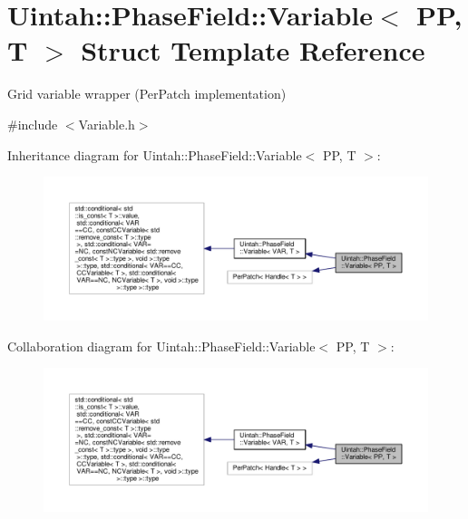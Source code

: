\hypertarget{structUintah_1_1PhaseField_1_1Variable_3_01PP_00_01T_01_4}{}\section{Uintah\+:\+:Phase\+Field\+:\+:Variable$<$ PP, T $>$ Struct Template Reference}
\label{structUintah_1_1PhaseField_1_1Variable_3_01PP_00_01T_01_4}


Grid variable wrapper (Per\+Patch implementation)  




{\ttfamily \#include $<$Variable.\+h$>$}



Inheritance diagram for Uintah\+:\+:Phase\+Field\+:\+:Variable$<$ PP, T $>$\+:\nopagebreak
\begin{figure}[H]
\begin{center}
\leavevmode
\includegraphics[width=350pt]{structUintah_1_1PhaseField_1_1Variable_3_01PP_00_01T_01_4__inherit__graph}
\end{center}
\end{figure}


Collaboration diagram for Uintah\+:\+:Phase\+Field\+:\+:Variable$<$ PP, T $>$\+:\nopagebreak
\begin{figure}[H]
\begin{center}
\leavevmode
\includegraphics[width=350pt]{structUintah_1_1PhaseField_1_1Variable_3_01PP_00_01T_01_4__coll__graph}
\end{center}
\end{figure}


